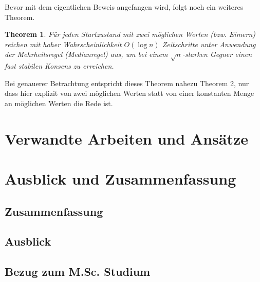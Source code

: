 \documentclass[12pt,ngerman,a4paper]{scrartcl}
\theoremstyle{plain}
\newtheorem{theorem}{Theorem}
\theoremstyle{definition}
\theoremstyle{remark}
\begin{document}
Bevor mit dem eigentlichen Beweis angefangen wird, folgt noch ein weiteres Theorem.

\begin{theorem}
Für jeden Startzustand mit zwei möglichen Werten (bzw. Eimern) reichen mit hoher
Wahrscheinlichkeit $O(\log n)$ Zeitschritte unter Anwendung der Mehrheitsregel
(Medianregel) aus, um bei einem $\sqrt{n}$-starken Gegner einen fast stabilen
Konsens zu erreichen.
\end{theorem}

Bei genauerer Betrachtung entspricht dieses Theorem nahezu Theorem 2, nur dass
hier explizit von zwei möglichen Werten statt von einer konstanten Menge an
möglichen Werten die Rede ist.



\section{Verwandte Arbeiten und Ansätze}

\section{Ausblick und Zusammenfassung}

\subsection{Zusammenfassung}

\subsection{Ausblick}

\subsection{Bezug zum M.Sc. Studium}

\newpage

\printbibliography
\end{document}
